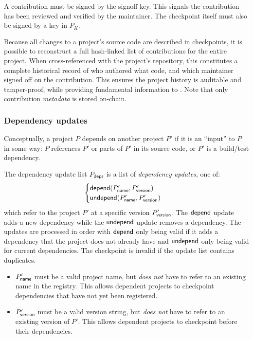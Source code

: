 A contribution must be signed by the signoff key. This signals
the contribution has been reviewed and verified by the maintainer. The
checkpoint itself must also be signed by a key in $P_K$.

Because all changes to a project's source code are described in checkpoints, it
is possible to reconstruct a full hash-linked list of contributions for the
entire project. When cross-referenced with the project's repository, this
constitutes a complete historical record of who authored what code, and which
maintainer signed off on the contribution. This ensures the project history is
auditable and tamper-proof, while providing fundamental information to
\osrank{}. Note that only contribution \emph{metadata} is stored
on-chain.

\subsubsection{Dependency updates}
\label{s:checkpoint-deps}
Conceptually, a project $P$ depends on another project $P'$ if it is an
``input'' to $P$ in some way: $P$ references $P'$ or parts of $P'$ in its
source code, or $P'$ is a build/test dependency.

The dependency update list $P_{\mathsf{deps}}$ is a list of \emph{dependency
  updates}, one of:
\[
    \begin{cases}
        \mathsf{depend}(P'_{\mathsf{name}}, P'_{\mathsf{version}}) \\
        \mathsf{undepend}(P'_{\mathsf{name}}, P'_{\mathsf{version}})
    \end{cases}
\]
which refer to the project $P'$ at a specific version $P'_{\mathsf{version}}$.
The $\mathsf{depend}$ update adds a new dependency while the $\mathsf{undepend}$ update removes
a dependency. The updates are processed in order with $\mathsf{depend}$ only being
valid if it adds a dependency that the project does not already have and
$\mathsf{undepend}$ only being valid for current dependencies. The checkpoint is
invalid if the update list contains duplicates.


\bigskip
\validation
\begin{itemize}
    \item $P'_{\mathsf{name}}$ must be a valid project name, but \emph{does not}
        have to refer to an existing name in the registry. This allows dependent
        projects to checkpoint dependencies that have not yet been registered.
    \item $P'_{\mathsf{version}}$ must be a valid version string, but \emph{does not}
        have to refer to an existing version of $P'$. This allows dependent projects
        to checkpoint before their dependencies.
\end{itemize}

